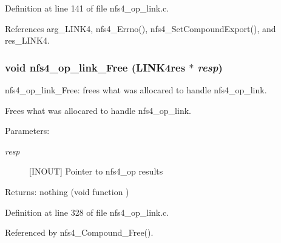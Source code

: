 Definition at line 141 of file nfs4\_\-op\_\-link.c.

References arg\_\-LINK4, nfs4\_\-Errno(), nfs4\_\-Set\-Compound\-Export(), and res\_\-LINK4.
\subsubsection{\setlength{\rightskip}{0pt plus 5cm}void nfs4\_\-op\_\-link\_\-Free (LINK4res $\ast$ {\em resp})}\label{nfs4__op__link_8c_a3}


nfs4\_\-op\_\-link\_\-Free: frees what was allocared to handle nfs4\_\-op\_\-link.

Frees what was allocared to handle nfs4\_\-op\_\-link.

\begin{Desc}
\item[Parameters:]
\begin{description}
\item[{\em resp}][INOUT] Pointer to nfs4\_\-op results\end{description}
\end{Desc}
\begin{Desc}
\item[Returns:]nothing (void function ) \end{Desc}


Definition at line 328 of file nfs4\_\-op\_\-link.c.

Referenced by nfs4\_\-Compound\_\-Free().